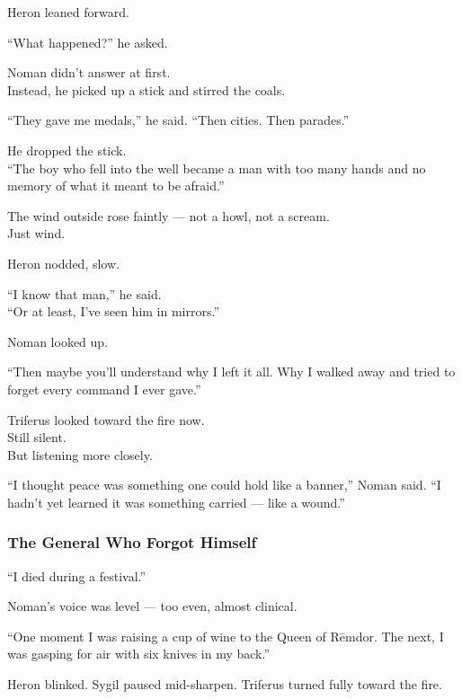 \documentclass[12pt]{article}
\begin{document}
Heron leaned forward.

“What happened?” he asked.

Noman didn’t answer at first.\\
Instead, he picked up a stick and stirred the coals.

“They gave me medals,” he said. “Then cities. Then parades.”

He dropped the stick.\\
“The boy who fell into the well became a man with too many hands and no memory of what it meant to be afraid.”

The wind outside rose faintly — not a howl, not a scream.\\
Just wind.

\vspace{1em}

Heron nodded, slow.

“I know that man,” he said.\\
“Or at least, I’ve seen him in mirrors.”

\vspace{1em}

Noman looked up.

“Then maybe you’ll understand why I left it all. Why I walked away and tried to forget every command I ever gave.”

Triferus looked toward the fire now.\\
Still silent.\\
But listening more closely.

\vspace{1em}

“I thought peace was something one could hold like a banner,” Noman said. “I hadn’t yet learned it was something carried — like a wound.”

\dotfill

\subsubsection{The General Who Forgot Himself}

“I died during a festival.”

Noman’s voice was level — too even, almost clinical.

“One moment I was raising a cup of wine to the Queen of Rēmdor. The next, I was gasping for air with six knives in my back.”

\vspace{1em}

Heron blinked. Sygil paused mid-sharpen. Triferus turned fully toward the fire.
\end{document}
